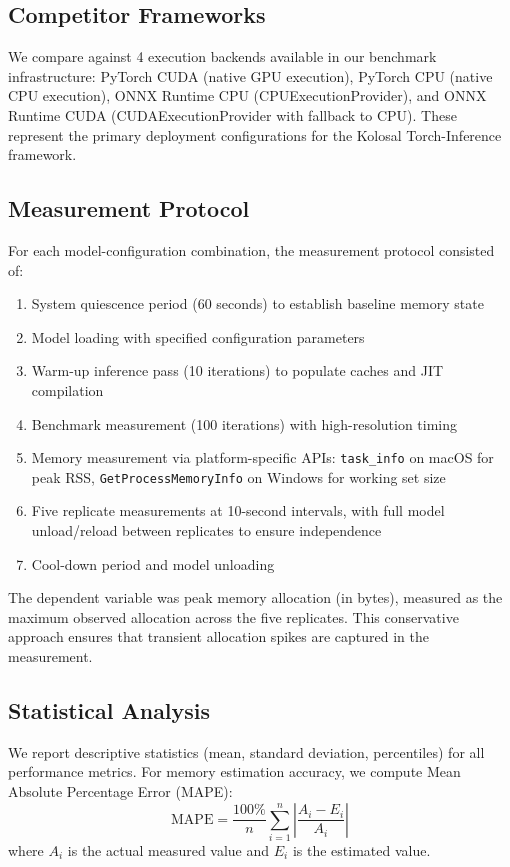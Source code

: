 \documentclass[10pt,twocolumn,a4paper]{article}
\theoremstyle{definition}
\theoremstyle{plain}
\begin{document}
\subsection{Competitor Frameworks}

We compare against 4 execution backends available in our benchmark infrastructure: PyTorch CUDA (native GPU execution), PyTorch CPU (native CPU execution), ONNX Runtime CPU (CPUExecutionProvider), and ONNX Runtime CUDA (CUDAExecutionProvider with fallback to CPU). These represent the primary deployment configurations for the Kolosal Torch-Inference framework.

\subsection{Measurement Protocol}

For each model-configuration combination, the measurement protocol consisted of:
\begin{enumerate}
    \item System quiescence period (60 seconds) to establish baseline memory state
    \item Model loading with specified configuration parameters
    \item Warm-up inference pass (10 iterations) to populate caches and JIT compilation
    \item Benchmark measurement (100 iterations) with high-resolution timing
    \item Memory measurement via platform-specific APIs: \texttt{task\_info} on macOS for peak RSS, \texttt{GetProcessMemoryInfo} on Windows for working set size
    \item Five replicate measurements at 10-second intervals, with full model unload/reload between replicates to ensure independence
    \item Cool-down period and model unloading
\end{enumerate}

The dependent variable was peak memory allocation (in bytes), measured as the maximum observed allocation across the five replicates. This conservative approach ensures that transient allocation spikes are captured in the measurement.

\subsection{Statistical Analysis}

We report descriptive statistics (mean, standard deviation, percentiles) for all performance metrics. For memory estimation accuracy, we compute Mean Absolute Percentage Error (MAPE):
\begin{equation}
    \mathrm{MAPE} = \frac{100\%}{n} \sum_{i=1}^{n} \left| \frac{A_i - E_i}{A_i} \right|
    \label{eq:mape}
\end{equation}
where $A_i$ is the actual measured value and $E_i$ is the estimated value.
\end{document}
